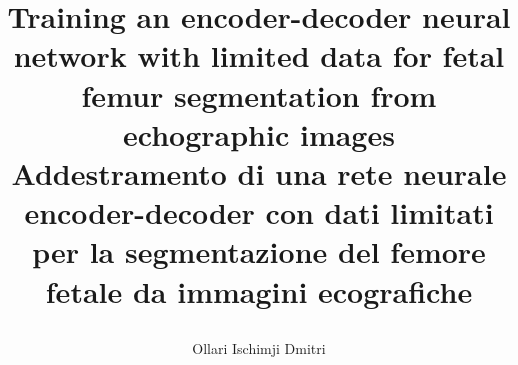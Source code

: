 \documentclass[12pt, a4paper, twoside]{book}
\let\origdoublepage\cleardoublepage
\newcommand{\clearemptydoublepage}{%
	\clearpage
	{\pagestyle{empty}\origdoublepage}%
}
\let\cleardoublepage\clearemptydoublepage
\begin{document}
\title{

  \begin{center}
    Training an encoder-decoder neural network with limited data for fetal femur segmentation from echographic images \\
    \large Addestramento di una rete neurale encoder-decoder con dati limitati per la segmentazione del femore fetale da immagini ecografiche
  \end{center}
}
\author{Ollari Ischimji Dmitri}

\maketitle

\cleardoublepage

\tableofcontents
\cleardoublepage
\listoffigures
\cleardoublepage
\listoftables
\cleardoublepage







\cleardoublepage


\end{document}
